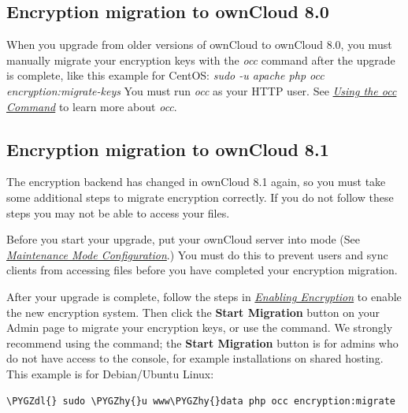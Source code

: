 \documentclass[letterpaper,10pt,english]{sphinxmanual}
\def\PYGZdl{\char`\$}
\def\PYGZhy{\char`\-}
\begin{document}
\subsection{Encryption migration to ownCloud 8.0}
\label{configuration_files/encryption_configuration:encryption-migration-to-owncloud-8-0}\label{configuration_files/encryption_configuration:upgrading-encryption-label}
When you upgrade from older versions of ownCloud to ownCloud 8.0, you must manually migrate
your encryption keys with the \emph{occ} command after the upgrade is complete, like this
example for CentOS: \emph{sudo -u apache php occ encryption:migrate-keys} You must run \emph{occ} as
your HTTP user. See {\hyperref[configuration_server/occ_command::doc]{\emph{\emph{Using the occ Command}}}} to learn more about \emph{occ}.


\subsection{Encryption migration to ownCloud 8.1}
\label{configuration_files/encryption_configuration:encryption-migration-to-owncloud-8-1}
The encryption backend has changed in ownCloud 8.1 again, so you must take some
additional steps to migrate encryption correctly. If you do not follow these
steps you may not be able to access your files.

Before you start your upgrade, put your ownCloud server into
 mode (See {\hyperref[maintenance/enable_maintenance::doc]{\emph{\emph{Maintenance Mode Configuration}}}}.)
You must do this to prevent users and sync clients from accessing files before
you have completed your encryption migration.

After your upgrade is complete, follow the steps in
{\hyperref[configuration_files/encryption_configuration:enable\string-encryption\string-label]{\emph{Enabling Encryption}}} to
enable the new encryption system. Then click the \textbf{Start Migration} button on
your Admin page to migrate your encryption keys, or use the  command. We
strongly recommend using the  command; the \textbf{Start Migration} button is
for admins who do not have access to the console, for example installations on
shared hosting. This example is for Debian/Ubuntu Linux:

\begin{Verbatim}[commandchars=\\\{\}]
\PYGZdl{} sudo \PYGZhy{}u www\PYGZhy{}data php occ encryption:migrate
\end{Verbatim}
\end{document}
